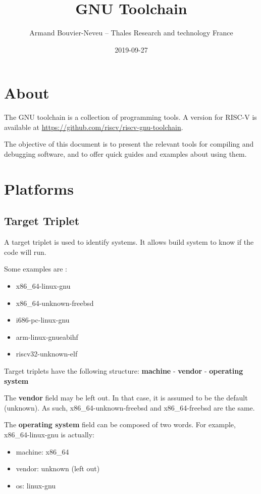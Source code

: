 \documentclass{article}
\title{GNU Toolchain}
\date{2019-09-27}
\author{Armand Bouvier-Neveu -- Thales Research and technology France}
\begin{document}
	\maketitle
	
	\section{About}
	
	The GNU toolchain is a collection of programming tools. A version for RISC-V is available at \url{https://github.com/riscv/riscv-gnu-toolchain}.
	
	The objective of this document is to present the relevant tools for compiling and debugging software, and to offer quick guides and examples about using them.
	
	\newpage
	\section{Platforms}
	
	\subsection{Target Triplet}
	
	A target triplet is used to identify systems. It allows build system to know if the code will run.
	
	Some examples are :
	
	\vspace{-\topsep}
	\begin{itemize}
	\item x86\_64-linux-gnu
	\item x86\_64-unknown-freebsd
	\item i686-pc-linux-gnu
	\item arm-linux-gnueabihf
	\item riscv32-unknown-elf
	\end{itemize}
	
	Target triplets have the following structure: \textbf{machine} - \textbf{vendor} - \textbf{operating system}
	
	The \textbf{vendor} field may be left out. In that case, it is assumed to be the default (unknown). As such, x86\_64-unknown-freebsd and x86\_64-freebsd are the same.
	
	The \textbf{operating system} field can be composed of two words. For example, x86\_64-linux-gnu is actually:
	
	\vspace{-\topsep}
	\begin{itemize}
	\item machine: x86\_64
	\item vendor: unknown (left out)
	\item os: linux-gnu
	\end{itemize}
	
\end{document}

